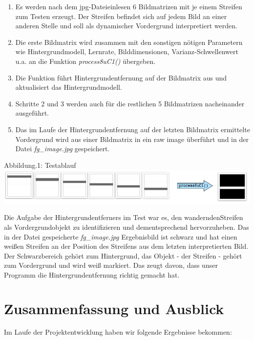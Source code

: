 \documentclass[10pt,a4paper]{article}
\begin{document}
\begin{enumerate}
\item Es werden nach dem jpg-Dateieinlesen 6 Bildmatrizen mit je einem Streifen zum Testen erzeugt. Der Streifen befindet sich auf jedem Bild an einer anderen Stelle und soll als dynamischer Vordergrund interpretiert werden. 
\item Die erste Bildmatrix wird zusammen mit den sonstigen nötigen Parametern wie Hintergrundmodell, Lernrate, Bilddimensionen, Varianz-Schwellenwert u.a. an die Funktion {\it process8uC1()} übergeben.
\item Die Funktion führt Hintergrundentfernung auf der Bildmatrix aus und aktualisiert das Hintergrundmodell.
\item Schritte 2 und 3 werden auch für die restlichen 5 Bildmatrizen nacheinander ausgeführt.
\item Das im Laufe der Hintergrundentfernung auf der letzten Bildmatrix ermittelte Vordergrund wird aus einer Bildmatrix in ein raw image überführt und in der Datei {\it fg\_image.jpg} gespeichert.
\end{enumerate}

Abbildung.1: Testablauf \newline
\includegraphics[width=\linewidth]{testfall}

Die Aufgabe der Hintergrundentferners im Test war es, den \glqq wandernden\grqq Streifen als Vordergrundobjekt zu identifizieren und dementsprechend hervorzuheben.
Das in der Datei gespeicherte {\it fg\_image.jpg} Ergebnisbild ist schwarz und hat einen weißen Streifen an der Position des Streifens aus dem letzten interpretierten Bild. Der Schwarzbereich gehört zum Hintergrund, das Objekt - der Streifen - gehört zum Vordergrund und wird weiß markiert. Das zeugt davon, dass unser Programm die Hintergrundentfernung richtig gemacht hat.

\newpage
\section{Zusammenfassung und Ausblick}

Im Laufe der Projektentwicklung haben wir folgende Ergebnisse bekommen:
\end{document}
